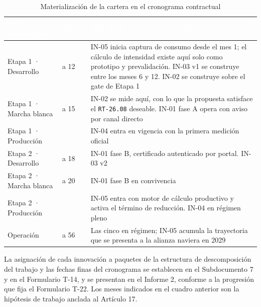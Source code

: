 \begin{table}[htbp]
\centering
\caption{Materialización de la cartera en el cronograma contractual}
\label{tab:etapas}
\begin{tabularx}{\textwidth}{@{}>{\raggedright\arraybackslash}p{4.3cm}>{\raggedright\arraybackslash}p{1.6cm}>{\raggedright\arraybackslash}X@{}}
\toprule
\rowcolor{terabyteFondo}
\textcolor{white}{\bfseries Fase contractual} &
\textcolor{white}{\bfseries Meses} &
\textcolor{white}{\bfseries Qué de la cartera ocurre allí} \\
\midrule
Etapa 1 · Desarrollo & 1 a 12 &
IN-05 inicia captura de consumo desde el mes 1; el cálculo de intensidad existe
aquí solo como prototipo y prevalidación. IN-03 v1 se construye entre los meses
6 y 12. IN-02 se construye sobre el gate de Etapa 1 \\
\addlinespace
Etapa 1 · Marcha blanca & 13 a 15 &
IN-02 se mide aquí, con lo que la propuesta satisface el \texttt{RT-26.08}
deseable. IN-01 fase A opera con aviso por canal directo \\
\addlinespace
Etapa 1 · Producción & 16 &
IN-04 entra en vigencia con la primera medición oficial \\
\addlinespace
Etapa 2 · Desarrollo & 13 a 18 &
IN-01 fase B, certificado autenticado por portal. IN-03 v2 \\
\addlinespace
Etapa 2 · Marcha blanca & 19 a 20 & IN-01 fase B en convivencia \\
\addlinespace
Etapa 2 · Producción & 21 &
IN-05 entra con motor de cálculo productivo y activa el término de reducción.
IN-04 en régimen pleno \\
\addlinespace
Operación & 21 a 56 &
Las cinco en régimen; IN-05 acumula la trayectoria que se presenta a la alianza
naviera en 2029 \\
\bottomrule
\end{tabularx}
\end{table}

\begin{bloqueSupuesto}
La asignación de cada innovación a paquetes de la estructura de descomposición
del trabajo y las fechas finas del cronograma se establecen en el Subdocumento
7 y en el Formulario T-14, y se presentan en el Informe 2, conforme a la
progresión que fija el Formulario T-22. Los meses indicados en el cuadro
anterior son la hipótesis de trabajo anclada al Artículo 17\textdegree{}.
\end{bloqueSupuesto}

